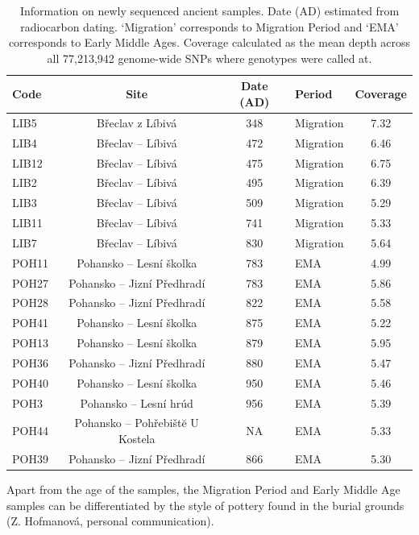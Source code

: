 \tabcolsep=0.11cm
\begin{table}
\small
\centering
\begin{tabular}[t]{l|c|c|l|c}
\hline
Code & Site & Date (AD) & Period & Coverage\\
\hline
LIB5 & Břeclav z Líbivá & 348 & Migration & 7.32\\
\hline
LIB4 & Břeclav – Líbivá & 472 & Migration & 6.46\\
\hline
LIB12 & Břeclav – Líbivá & 475 & Migration & 6.75\\
\hline
LIB2 & Břeclav – Líbivá & 495 & Migration & 6.39\\
\hline
LIB3 & Břeclav – Líbivá & 509 & Migration & 5.29\\
\hline
LIB11 & Břeclav – Líbivá & 741 & Migration & 5.33\\
\hline
LIB7 & Břeclav – Líbivá & 830 & Migration & 5.64\\
\hline
POH11 & Pohansko – Lesní školka & 783 & EMA & 4.99\\
\hline
POH27 & Pohansko – Jizní Předhradí & 783 & EMA & 5.86\\
\hline
POH28 & Pohansko – Jizní Předhradí & 822 & EMA & 5.58\\
\hline
POH41 & Pohansko – Lesní školka & 875 & EMA & 5.22\\
\hline
POH13 & Pohansko – Lesní školka & 879 & EMA & 5.95\\
\hline
POH36 & Pohansko – Jizní Předhradí & 880 & EMA & 5.47\\
\hline
POH40 & Pohansko – Lesní školka & 950 & EMA & 5.46\\
\hline
POH3 & Pohansko – Lesní hrúd & 956 & EMA & 5.39\\
\hline
POH44 & Pohansko – Pohřebištĕ U Kostela & NA & EMA & 5.33\\
\hline
POH39 & Pohansko – Jizní Předhradí & 866 & EMA & 5.30\\
\hline
\end{tabular}
\caption{Information on newly sequenced ancient samples. Date (AD) estimated from radiocarbon dating. `Migration' corresponds to Migration Period and `EMA' corresponds to Early Middle Ages. Coverage calculated as the mean depth across all 77,213,942 genome-wide SNPs where genotypes were called at.}
\end{table}

Apart from the age of the samples, the Migration Period and Early Middle Age samples can be differentiated by the style of pottery found in the burial grounds (Z. Hofmanová, personal communication).  


